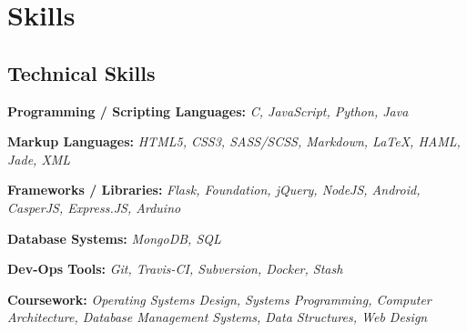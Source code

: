 \documentclass[12pt,a4paper,sans]{moderncv}        %
\begin{document}
\section{Skills}

\vspace{5pt}

\subsection{Technical Skills}

\vspace{5pt}

\begin{itemize}

\item{\textbf{Programming / Scripting Languages:} \textit{C, JavaScript, Python, Java}

\small{}}

\vspace{6pt}

\item{\textbf{Markup Languages:}\textit{ HTML5, CSS3, SASS/SCSS, Markdown, LaTeX, HAML, Jade, XML }

\vspace{3pt}

\small{}}

\vspace{6pt}

\item{\textbf{Frameworks / Libraries:}\textit{ Flask, Foundation, jQuery, NodeJS, Android, CasperJS, Express.JS, Arduino}

\vspace{3pt}
\item{\textbf{Database Systems:}\textit{ MongoDB, SQL} }

\vspace{3pt}

\small{}}

\vspace{6pt}

\item{\textbf{Dev-Ops Tools:}\textit{ Git, Travis-CI, Subversion, Docker, Stash}

\vspace{3pt}

\small{}}

\vspace{6pt}

\item{\textbf{Coursework:}\textit{ Operating Systems Design, Systems Programming, Computer Architecture, Database Management Systems, Data Structures, Web Design} }

\vspace{3pt}

\small{}

\vspace{6pt}

\end{itemize}
\end{document}
